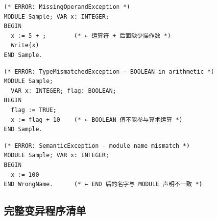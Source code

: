 \documentclass[12pt,a4paper,fontset=none]{ctexart}
\begin{document}
\begin{lstlisting}[style=oberoncode,caption={语法错误：缺少操作数（Sample.010）}]
(* ERROR: MissingOperandException *)
MODULE Sample; VAR x: INTEGER;
BEGIN
  x := 5 + ;        (* ← 运算符 + 后面缺少操作数 *)
  Write(x)
END Sample.
\end{lstlisting}

\begin{lstlisting}[style=oberoncode,caption={语义错误：类型不兼容（Sample.011）}]
(* ERROR: TypeMismatchedException - BOOLEAN in arithmetic *)
MODULE Sample;
  VAR x: INTEGER; flag: BOOLEAN;
BEGIN
  flag := TRUE;
  x := flag + 10    (* ← BOOLEAN 值不能参与算术运算 *)
END Sample.
\end{lstlisting}

\begin{lstlisting}[style=oberoncode,caption={语义错误：模块名不匹配（Sample.016）}]
(* ERROR: SemanticException - module name mismatch *)
MODULE Sample; VAR x: INTEGER;
BEGIN
  x := 100
END WrongName.      (* ← END 后的名字与 MODULE 声明不一致 *)
\end{lstlisting}

\subsection{完整变异程序清单}
\end{document}
